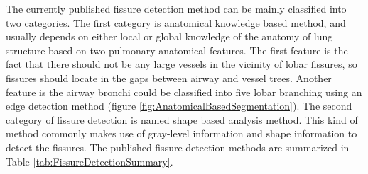 The currently published fissure detection method can be mainly classified into two categories. The first category is anatomical knowledge based method, and usually depends on either local or global knowledge of the anatomy of lung structure based on two pulmonary anatomical features. The first feature is the fact that there should not be any large vessels in the vicinity of lobar fissures, so fissures should locate in the gaps between airway and vessel trees. Another feature is the airway bronchi could be classified into five lobar branching using an edge detection method (figure \ref{fig:AnatomicalBasedSegmentation}). The second category of fissure detection is named shape based analysis method. This kind of method commonly makes use of gray-level information and shape information to detect the fissures. The published fissure detection methods are summarized in Table \ref{tab:FissureDetectionSummary}.

